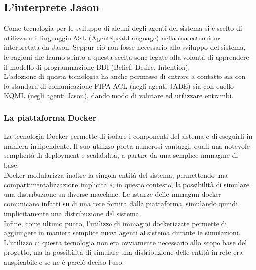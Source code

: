 
\subsection{L'interprete Jason}
Come tecnologia per lo sviluppo di alcuni degli agenti del sistema si è scelto di utilizzare il linguaggio ASL (AgentSpeakLanguage) nella sua estensione interpretata da Jason. Seppur ciò non fosse necessario allo sviluppo del sistema, le ragioni che hanno spinto a questa scelta sono legate alla volontà di apprendere il modello di programmazione BDI (Belief, Desire, Intention).\\
L'adozione di questa tecnologia ha anche permesso di entrare a contatto sia con lo standard di comunicazione FIPA-ACL (negli agenti JADE) sia con quello KQML (negli agenti Jason), dando modo di valutare ed utilizzare entrambi.

\subsubsection{La piattaforma Docker}
La tecnologia Docker permette di isolare i componenti del sistema e di eseguirli in maniera indipendente. Il suo utilizzo porta numerosi vantaggi, quali una notevole semplicità di deployment e scalabilità, a partire da una semplice immagine di base.\\
Docker modularizza inoltre la singola entità del sistema, permettendo una compartimentalizzazione implicita e, in questo contesto, la possibilità di simulare una distribuzione su diverse macchine. Le istanze delle immagini docker comunicano infatti su di una rete fornita dalla piattaforma, simulando quindi implicitamente una distribuzione del sistema.\\
Infine, come ultimo punto, l'utilizzo di immagini dockerizzate permette di aggiungere in maniera semplice nuovi agenti al sistema durante le simulazioni.\\
L'utilizzo di questa tecnologia non era ovviamente necessario allo scopo base del progetto, ma la possibilità di simulare una distribuzione delle entità in rete era auspicabile e se ne è perciò deciso l'uso.

